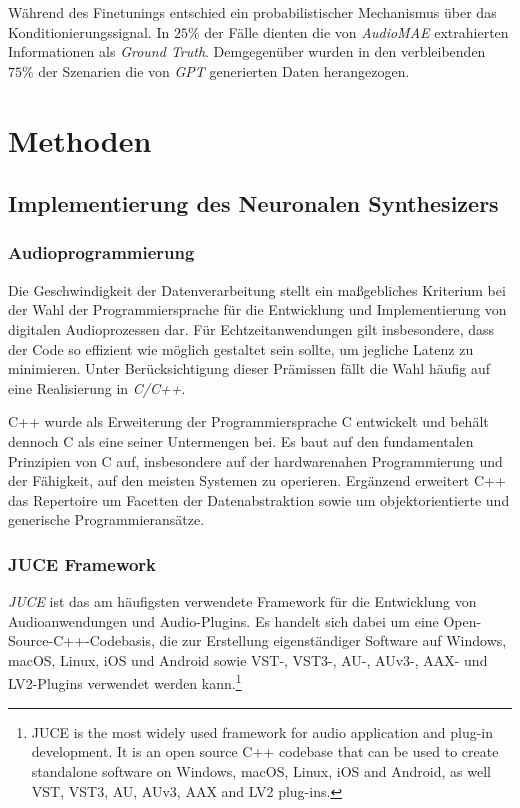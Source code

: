 \documentclass[
  a4paper,  %
  twoside,  %
  bibliography=totoc,
  headsepline,
  cleardoublepage=empty,
  parskip=half,
  draft=false
]{scrbook}
\begin{document}
Während des Finetunings entschied ein probabilistischer Mechanismus über das Konditionierungssignal. In $25\%$ der Fälle dienten die von \emph{AudioMAE} extrahierten Informationen als \emph{Ground Truth}. Demgegenüber wurden in den verbleibenden $75\%$ der Szenarien die von \emph{GPT} generierten Daten herangezogen. \cite{liu_audioldm2_2023}

\chapter{Methoden}
\section{Implementierung des Neuronalen Synthesizers}
\subsection{Audioprogrammierung}
Die Geschwindigkeit der Datenverarbeitung stellt ein maßgebliches Kriterium bei der Wahl der Programmiersprache für die Entwicklung und Implementierung von digitalen Audioprozessen dar. Für Echtzeitanwendungen gilt insbesondere, dass der Code so effizient wie möglich gestaltet sein sollte, um jegliche Latenz zu minimieren. Unter Berücksichtigung dieser Prämissen fällt die Wahl häufig auf eine Realisierung in \emph{C/C++}. \cite{doumler_c_2015, boulanger_audio_2011}

C++ wurde als Erweiterung der Programmiersprache C entwickelt und behält dennoch C als eine seiner Untermengen bei. Es baut auf den fundamentalen Prinzipien von C auf, insbesondere auf der hardwarenahen Programmierung und der Fähigkeit, auf den meisten Systemen zu operieren. Ergänzend erweitert C++ das Repertoire um Facetten der Datenabstraktion sowie um objektorientierte und generische Programmieransätze. \cite{stroustrup_c_1997}

\subsection{JUCE Framework}
\glqq\emph{JUCE} ist das am häufigsten verwendete Framework für die Entwicklung von Audioanwendungen und Audio-Plugins. Es handelt sich dabei um eine Open-Source-C++-Codebasis, die zur Erstellung eigenständiger Software auf Windows, macOS, Linux, iOS und Android sowie VST-, VST3-, AU-, AUv3-, AAX- und LV2-Plugins verwendet werden kann.\grqq \footnote{
JUCE is the most widely used framework for audio application and plug-in development. It is an open source C++ codebase that can be used to create standalone software on Windows, macOS, Linux, iOS and Android, as well VST, VST3, AU, AUv3, AAX and LV2 plug-ins.
} \cite{noauthor_juce_nodate}
\end{document}

